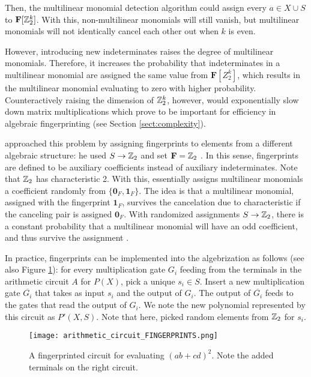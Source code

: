 Then, the multilinear monomial detection algorithm 
could assign every $a \in X \cup S$ to $\mathbf{F}[\mathbb Z_2^k]$. 
With this, non-multilinear monomials will still vanish, but multilinear monomials 
will not identically cancel each other out when $k$ is even. 

However, introducing new indeterminates raises the degree of multilinear monomials. 
Therefore, it increases the probability that indeterminates in a multilinear monomial are 
assigned the same value from $\mathbf{F}[Z_2^k]$, which results in the 
multilinear monomial evaluating to zero with higher probability. 
Counteractively raising the dimension of $\mathbb Z_2^k$, however, would  
exponentially slow down matrix multiplications which prove to be %
important for efficiency in algebraic fingerprinting (see Section \ref{sect:complexity}).

\citeauthor{Koutis08} approached this problem by assigning fingerprints to elements 
from a different algebraic structure: he used $S \to \mathbb Z_2$ and set 
$\mathbf{F} = \mathbb Z_2$ \cite{Koutis08}. In this sense, 
fingerprints are defined to be auxiliary coefficients instead of auxiliary indeterminates. 
Note that $\mathbb Z_2$ has characteristic 2. With this, 
\citeauthor{Koutis08} essentially assigns multilinear monomials a coefficient 
randomly from $\{\mathbf{0}_F, \mathbf{1}_F\}$. The idea is that a multilinear monomial, 
assigned with the fingerprint $\mathbf{1}_F$,  
survives the cancelation due to characteristic if the canceling pair is assigned $\mathbf{0}_F$. 
With randomized assignments $S \to \mathbb Z_2$, 
there is a constant probability that a multilinear 
monomial will have an odd coefficient, and thus survive the assignment \cite{Koutis08}.

In practice, fingerprints can be implemented 
into the algebrization as follows (see also Figure \ref{fig:circuit_fingerprints}): 
for every multiplication gate $G_i$ feeding from the terminals in the arithmetic circuit $A$ for $P(X)$, 
pick a unique $s_i \in S$. Insert a new multiplication gate $\overbar{G_i}$ that takes 
as input $s_i$ and the output of $G_i$. The output of $\overbar{G_i}$ feeds to the 
gates that read the output of $G_i$. We note the new polynomial represented by this circuit 
as $P'(X, S)$. Note that here, 
\citeauthor{Koutis08} picked random elements from $\mathbb Z_2$ for $s_i$.

\begin{figure}[h]
  \texttt{[image: arithmetic\_circuit\_FINGERPRINTS.png]}
  \centering
  \caption{A fingerprinted circuit for evaluating $(ab+cd)^2$. 
  Note the added terminals on the right circuit.}
  \label{fig:circuit_fingerprints}
\end{figure}

